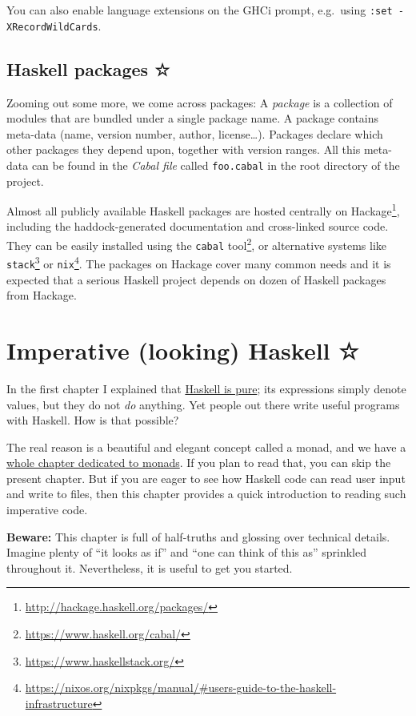 \documentclass[11pt,
  american,
  DIV13]{article}
\DeclareRobustCommand{\href}[2]{#2\footnote{\url{#1}}}
\begin{document}
You can also enable language extensions on the GHCi prompt, e.g.~using
\texttt{:set\ -XRecordWildCards}.

\hypertarget{haskell-packages}{%
\subsection{Haskell packages ☆}\label{haskell-packages}}

Zooming out some more, we come across packages: A \emph{package} is a
collection of modules that are bundled under a single package name. A
package contains meta-data (name, version number, author,
license\ldots). Packages declare which other packages they depend upon,
together with version ranges. All this meta-data can be found in the
\emph{Cabal file} called \texttt{foo.cabal} in the root directory of the
project.

Almost all publicly available Haskell packages are hosted centrally on
\href{http://hackage.haskell.org/packages/}{Hackage}, including the
haddock-generated documentation and cross-linked source code. They can
be easily installed using the
\href{https://www.haskell.org/cabal/}{\texttt{cabal} tool}, or
alternative systems like
\href{https://www.haskellstack.org/}{\texttt{stack}} or
\href{https://nixos.org/nixpkgs/manual/\#users-guide-to-the-haskell-infrastructure}{\texttt{nix}}.
The packages on Hackage cover many common needs and it is expected that
a serious Haskell project depends on dozen of Haskell packages from
Hackage.

\hypertarget{io}{%
\section{Imperative (looking) Haskell ☆}\label{io}}

In the first chapter I explained that \protect\hyperlink{pure}{Haskell
is pure}; its expressions simply denote values, but they do not
\emph{do} anything. Yet people out there write useful programs with
Haskell. How is that possible?

The real reason is a beautiful and elegant concept called a monad, and
we have a \protect\hyperlink{monads}{whole chapter dedicated to monads}.
If you plan to read that, you can skip the present chapter. But if you
are eager to see how Haskell code can read user input and write to
files, then this chapter provides a quick introduction to reading such
imperative code.

\textbf{Beware:} This chapter is full of half-truths and glossing over
technical details. Imagine plenty of ``it looks as if'' and ``one can
think of this as'' sprinkled throughout it. Nevertheless, it is useful
to get you started.
\end{document}
